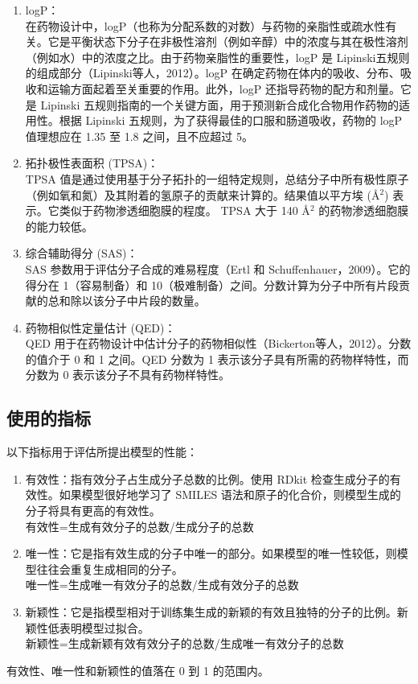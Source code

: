 \begin{translation}
\begin{enumerate}[label=\alph*)]
  \item logP： \\在药物设计中，logP（也称为分配系数的对数）与药物的亲脂性或疏水性有关。它是平衡状态下分子在非极性溶剂（例如辛醇）中的浓度与其在极性溶剂（例如水）中的浓度之比。由于药物亲脂性的重要性，logP 是 Lipinski五规则的组成部分（Lipinski等人，2012）。logP 在确定药物在体内的吸收、分布、吸收和运输方面起着至关重要的作用。此外，logP 还指导药物的配方和剂量。它是 Lipinski 五规则指南的一个关键方面，用于预测新合成化合物用作药物的适用性。根据 Lipinski 五规则，为了获得最佳的口服和肠道吸收，药物的 logP 值理想应在 1.35 至 1.8 之间，且不应超过 5。
  \item 拓扑极性表面积 (TPSA)：\\TPSA 值是通过使用基于分子拓扑的一组特定规则，总结分子中所有极性原子（例如氧和氮）及其附着的氢原子的贡献来计算的。结果值以平方埃 (Å$^2$) 表示。它类似于药物渗透细胞膜的程度。 TPSA 大于 140 Å$^2$ 的药物渗透细胞膜的能力较低。
  \item 综合辅助得分 (SAS)：\\SAS 参数用于评估分子合成的难易程度（Ertl 和 Schuffenhauer，2009）。它的得分在 1（容易制备）和 10（极难制备）之间。分数计算为分子中所有片段贡献的总和除以该分子中片段的数量。
  \item 药物相似性定量估计 (QED)：\\QED 用于在药物设计中估计分子的药物相似性（Bickerton等人，2012）。分数的值介于 0 和 1 之间。QED 分数为 1 表示该分子具有所需的药物样特性，而分数为 0 表示该分子不具有药物样特性。
\end{enumerate}

\subsection{使用的指标}

以下指标用于评估所提出模型的性能：


\begin{enumerate}[label=\alph*)]
  \item 有效性：指有效分子占生成分子总数的比例。使用 RDkit 检查生成分子的有效性。如果模型很好地学习了 SMILES 语法和原子的化合价，则模型生成的分子将具有更高的有效性。\\有效性=生成有效分子的总数/生成分子的总数
  \item 唯一性：它是指有效生成的分子中唯一的部分。如果模型的唯一性较低，则模型往往会重复生成相同的分子。\\唯一性=生成唯一有效分子的总数/生成有效分子的总数
  \item 新颖性：它是指模型相对于训练集生成的新颖的有效且独特的分子的比例。新颖性低表明模型过拟合。\\新颖性=生成新颖有效有效分子的总数/生成唯一有效分子的总数
\end{enumerate}
有效性、唯一性和新颖性的值落在 0 到 1 的范围内。


\end{translation}
